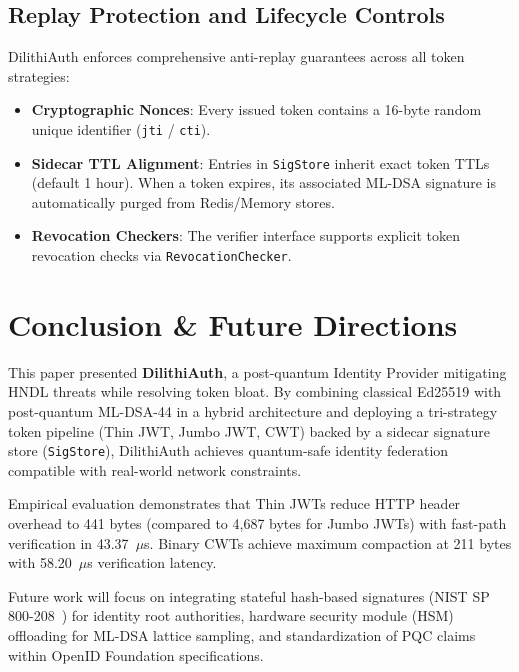 \documentclass[conference]{IEEEtran}
\begin{document}
\subsection{Replay Protection and Lifecycle Controls}
DilithiAuth enforces comprehensive anti-replay guarantees across all token strategies:
\begin{itemize}
    \item \textbf{Cryptographic Nonces}: Every issued token contains a 16-byte random unique identifier (\texttt{jti} / \texttt{cti}).
    \item \textbf{Sidecar TTL Alignment}: Entries in \texttt{SigStore} inherit exact token TTLs (default 1 hour). When a token expires, its associated ML-DSA signature is automatically purged from Redis/Memory stores.
    \item \textbf{Revocation Checkers}: The verifier interface supports explicit token revocation checks via \texttt{RevocationChecker}.
\end{itemize}

\section{Conclusion \& Future Directions}
This paper presented \textbf{DilithiAuth}, a post-quantum Identity Provider mitigating HNDL threats while resolving token bloat. By combining classical Ed25519 with post-quantum ML-DSA-44 in a hybrid architecture and deploying a tri-strategy token pipeline (Thin JWT, Jumbo JWT, CWT) backed by a sidecar signature store (\texttt{SigStore}), DilithiAuth achieves quantum-safe identity federation compatible with real-world network constraints.

Empirical evaluation demonstrates that Thin JWTs reduce HTTP header overhead to 441 bytes (compared to 4,687 bytes for Jumbo JWTs) with fast-path verification in 43.37~$\mu$s. Binary CWTs achieve maximum compaction at 211 bytes with 58.20~$\mu$s verification latency.

Future work will focus on integrating stateful hash-based signatures (NIST SP 800-208~\cite{sp800_208}) for identity root authorities, hardware security module (HSM) offloading for ML-DSA lattice sampling, and standardization of PQC claims within OpenID Foundation specifications.



\end{document}

